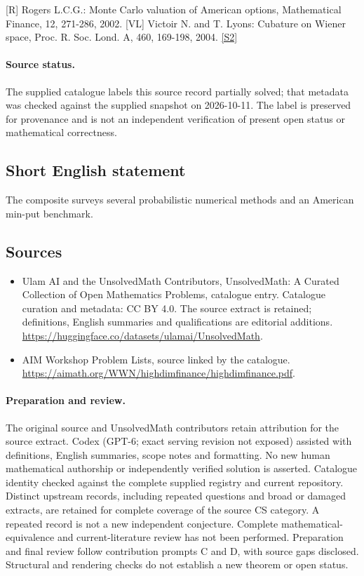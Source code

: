 \documentclass[11pt]{article}
\newcommand{\sref}[2]{\hyperlink{source:#1:#2}{[S#2]}}
\begin{document}
[R] Rogers L.C.G.: Monte Carlo valuation of American options, Mathematical Finance, 12, 271-286, 2002. [VL] Victoir N. and T. Lyons: Cubature on Wiener space, Proc. R. Soc. Lond. A, 460, 169-198, 2004. \sref{statement}{2}
\paragraph{Source status.}
The supplied catalogue labels this source record partially solved; that metadata was checked against the supplied snapshot on 2026-10-11. The label is preserved for provenance and is not an independent verification of present open status or mathematical correctness.
\subsection{Short English statement}
The composite surveys several probabilistic numerical methods and an American min-put benchmark.
\subsection{Sources}
\begin{itemize}
\item[\hypertarget{source:statement:1}{S1}] Ulam AI and the UnsolvedMath Contributors, UnsolvedMath: A Curated Collection of Open Mathematics Problems, catalogue entry. Catalogue curation and metadata: CC BY 4.0. The source extract is retained; definitions, English summaries and qualifications are editorial additions.
\url{https://huggingface.co/datasets/ulamai/UnsolvedMath}.
\item[\hypertarget{source:statement:2}{S2}] AIM Workshop Problem Lists, source linked by the catalogue.
\url{https://aimath.org/WWN/highdimfinance/highdimfinance.pdf}.
\end{itemize}
\paragraph{Preparation and review.}
The original source and UnsolvedMath contributors retain attribution for the source extract. Codex (GPT-6; exact serving revision not exposed) assisted with definitions, English summaries, scope notes and formatting. No new human mathematical authorship or independently verified solution is asserted. Catalogue identity checked against the complete supplied registry and current repository. Distinct upstream records, including repeated questions and broad or damaged extracts, are retained for complete coverage of the source CS category. A repeated record is not a new independent conjecture. Complete mathematical-equivalence and current-literature review has not been performed. Preparation and final review follow contribution prompts C and D, with source gaps disclosed. Structural and rendering checks do not establish a new theorem or open status.
\label{end:statement}
\end{document}
